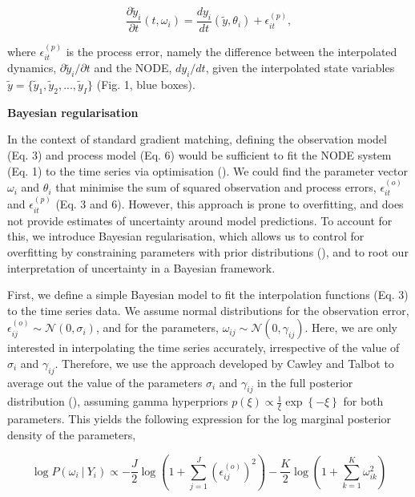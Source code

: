 \documentclass[11pt, oneside]{article}
\begin{document}
\vspace{-0.5cm}
\begin{equation}
    \frac{\partial \tilde{y}_i}{\partial t} (t, \omega_i) = \frac{dy_i}{dt} \left( \tilde{y},\theta_i \right) + \epsilon^{(p)}_{it},
\end{equation}

where $\epsilon^{(p)}_{it}$ is the process error, namely the difference between the interpolated dynamics, $\partial \tilde{y}_i/\partial t$ and the NODE, $dy_i/dt$, given the interpolated state variables $\tilde{y} = \{\tilde{y}_1,\tilde{y}_2, ...,\tilde{y}_I\}$ (Fig. 1, blue boxes). 

\textbf{Bayesian regularisation}

In the context of standard gradient matching, defining the observation model (Eq. 3) and process model (Eq. 6) would be sufficient to fit the NODE system (Eq. 1) to the time series via optimisation (\cite{Jost2000,Ellner2002,Wu2005}).
We could find the parameter vector $\omega_i$ and $\theta_i$ that minimise the sum of squared observation and process errors, $\epsilon_{it}^{(o)}$ and $\epsilon_{it}^{(p)}$ (Eq. 3 and 6).
However, this approach is prone to overfitting, and does not provide estimates of uncertainty around model predictions. 
To account for this, we introduce Bayesian regularisation, which allows us to control for overfitting by constraining parameters with prior distributions (\cite{Cawley2007}), and to root our interpretation of uncertainty in a Bayesian framework.

First, we define a simple Bayesian model to fit the interpolation functions (Eq. 3) to the time series data.
We assume normal distributions for the observation error, $\epsilon^{(o)}_{ij} \sim \mathcal{N}(0,\sigma_i)$, and for the parameters, $\omega_{ij} \sim \mathcal{N}(0,\gamma_{ij})$.
Here, we are only interested in interpolating the time series accurately, irrespective of the value of $\sigma_i$ and $\gamma_{ij}$.
Therefore, we use the approach developed by Cawley and Talbot to average out the value of the parameters $\sigma_i$ and $\gamma_{ij}$ in the full posterior distribution (\cite{Cawley2007}), assuming gamma hyperpriors $p(\xi) \propto \frac{1}{\xi} \exp\left\{- \xi \right\}$ for both parameters.
This yields the following expression for the log marginal posterior density of the parameters,

\vspace{-0.5cm}
\begin{equation}
    \log P(\omega_i ~|~ Y_i) \propto - \frac{J}{2} \log \left(1 + \sum_{j=1}^{J} \left( \epsilon^{(o)}_{ij} \right)^2 \right) - \frac{K}{2} \log \left(1 + \sum_{k=1}^{K} \omega_{ik}^2 \right)
\end{equation}
\end{document}
